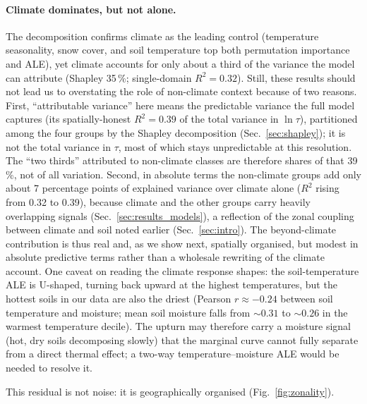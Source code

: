 \documentclass[12pt, a4paper]{article}
\begin{document}
\paragraph{Climate dominates, but not alone.}
The decomposition confirms climate as the leading control (temperature
seasonality, snow cover, and soil temperature top both permutation importance and
ALE), yet climate accounts for only about a third of the variance the model can
attribute (Shapley 35\,\%; single-domain $R^2=0.32$). Still, these results should not lead us to
overstating the role of non-climate context because of two reasons. 
First, ``attributable variance''
here means the predictable variance the full model captures (its spatially-honest
$R^2=0.39$ of the total variance in $\ln\tau$), partitioned among the four groups
by the Shapley decomposition (Sec.~\ref{sec:shapley}); it is not the total
variance in $\tau$, most of which stays unpredictable at this resolution. The
``two thirds'' attributed to non-climate classes are therefore shares of that
39\,\%, not of all variation. Second, in absolute terms the non-climate groups add
only about 7 percentage points of explained variance over climate alone ($R^2$
rising from 0.32 to 0.39), because climate and the other groups carry heavily
overlapping signals (Sec.~\ref{sec:results_models}), a reflection of the zonal
coupling between climate and soil noted earlier (Sec.~\ref{sec:intro}). The beyond-climate
contribution is thus real and, as we show next, spatially organised, but modest in
absolute predictive terms rather than a wholesale rewriting of the climate
account. One caveat on reading the climate response shapes: the soil-temperature
ALE is U-shaped, turning back upward at the highest temperatures, but the hottest
soils in our data are also the driest (Pearson $r\approx-0.24$ between soil
temperature and moisture; mean soil moisture falls from ${\sim}0.31$ to
${\sim}0.26$ in the warmest temperature decile). The upturn may therefore carry a
moisture signal (hot, dry soils decomposing slowly) that the marginal curve cannot
fully separate from a direct thermal effect; a two-way temperature--moisture ALE
would be needed to resolve it.

This residual is not noise: it is geographically organised (Fig.~\ref{fig:zonality}).
\end{document}
